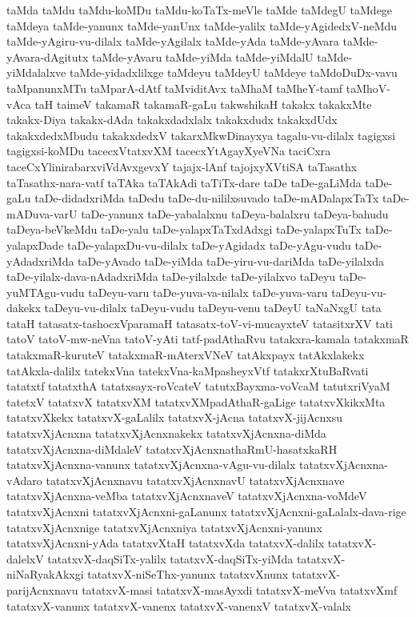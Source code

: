 {taMda
taMdu
taMdu-koMDu
taMdu-koTaTx-meVle
taMde
taMdegU
taMdege
taMdeya
taMde-yanunx
taMde-yanUnx
taMde-yalilx
taMde-yAgidedxV-neMdu
taMde-yAgiru-vu-dilalx
taMde-yAgilalx
taMde-yAda
taMde-yAvara
taMde-yAvara-dAgitutx
taMde-yAvaru
taMde-yiMda
taMde-yiMdalU
taMde-yiMdalalxve
taMde-yidadxlilxge
taMdeyu
taMdeyU
taMdeye
taMdoDuDx-vavu
taMpanunxMTu
taMparA-dAtf
taMviditAvx
taMhaM
taMheY-tamf
taMhoV-vAca
taH
taimeV
takamaR
takamaR-gaLu
takwshikaH
takakx
takakxMte
takakx-Diya
takakx-dAda
takakxdadxlalx
takakxdudx
takakxdUdx
takakxdedxMbudu
takakxdedxV
takarxMkwDinayxya
tagalu-vu-dilalx
tagigxsi
tagigxsi-koMDu
tacecxVtatxvXM
tacecxYtAgayXyeVNa
taciCxra
taceCxYlinirabarxviVdAvxgevxY
tajajx-lAnf
tajojxyXVtiSA
taTasathx
taTasathx-nara-vatf
taTAka
taTAkAdi
taTiTx-dare
taDe
taDe-gaLiMda
taDe-gaLu
taDe-didadxriMda
taDedu
taDe-du-nililxsuvado
taDe-mADalapxTaTx
taDe-mADuva-varU
taDe-yanunx
taDe-yabalalxnu
taDeya-balalxru
taDeya-bahudu
taDeya-beVkeMdu
taDe-yalu
taDe-yalapxTaTxdAdxgi
taDe-yalapxTuTx
taDe-yalapxDade
taDe-yalapxDu-vu-dilalx
taDe-yAgidadx
taDe-yAgu-vudu
taDe-yAdadxriMda
taDe-yAvado
taDe-yiMda
taDe-yiru-vu-dariMda
taDe-yilalxda
taDe-yilalx-dava-nAdadxriMda
taDe-yilalxde
taDe-yilalxvo
taDeyu
taDe-yuMTAgu-vudu
taDeyu-varu
taDe-yuva-va-nilalx
taDe-yuva-varu
taDeyu-vu-dakekx
taDeyu-vu-dilalx
taDeyu-vudu
taDeyu-venu
taDeyU
taNaNxgU
tata
tataH
tatasatx-tashocxVparamaH
tatasatx-toV-vi-mucayxteV
tatasitxrXV
tati
tatoV
tatoV-mw-neVna
tatoV-yAti
tatf-padAthaRvu
tatakxra-kamala
tatakxmaR
tatakxmaR-kuruteV
tatakxmaR-mAterxVNeV
tatAkxpayx
tatAkxlakekx
tatAkxla-dalilx
tatekxVna
tatekxVna-kaMpasheyxVtf
tatakxrXtuBaRvati
tatatxtf
tatatxthA
tatatxsayx-roVcateV
tatutxBayxma-voVcaM
tatutxriVyaM
tatetxV
tatatxvX
tatatxvXM
tatatxvXMpadAthaR-gaLige
tatatxvXkikxMta
tatatxvXkekx
tatatxvX-gaLalilx
tatatxvX-jAcna
tatatxvX-jijAcnxsu
tatatxvXjAcnxna
tatatxvXjAcnxnakekx
tatatxvXjAcnxna-diMda
tatatxvXjAcnxna-diMdaleV
tatatxvXjAcnxnathaRmU-hasatxkaRH
tatatxvXjAcnxna-vanunx
tatatxvXjAcnxna-vAgu-vu-dilalx
tatatxvXjAcnxna-vAdaro
tatatxvXjAcnxnavu
tatatxvXjAcnxnavU
tatatxvXjAcnxnave
tatatxvXjAcnxna-veMba
tatatxvXjAcnxnaveV
tatatxvXjAcnxna-voMdeV
tatatxvXjAcnxni
tatatxvXjAcnxni-gaLanunx
tatatxvXjAcnxni-gaLalalx-dava-rige
tatatxvXjAcnxnige
tatatxvXjAcnxniya
tatatxvXjAcnxni-yanunx
tatatxvXjAcnxni-yAda
tatatxvXtaH
tatatxvXda
tatatxvX-dalilx
tatatxvX-dalelxV
tatatxvX-daqSiTx-yalilx
tatatxvX-daqSiTx-yiMda
tatatxvX-niNaRyakAkxgi
tatatxvX-niSeThx-yanunx
tatatxvXnunx
tatatxvX-parijAcnxnavu
tatatxvX-masi
tatatxvX-masAyxdi
tatatxvX-meVva
tatatxvXmf
tatatxvX-vanunx
tatatxvX-vanenx
tatatxvX-vanenxV
tatatxvX-valalx
}
